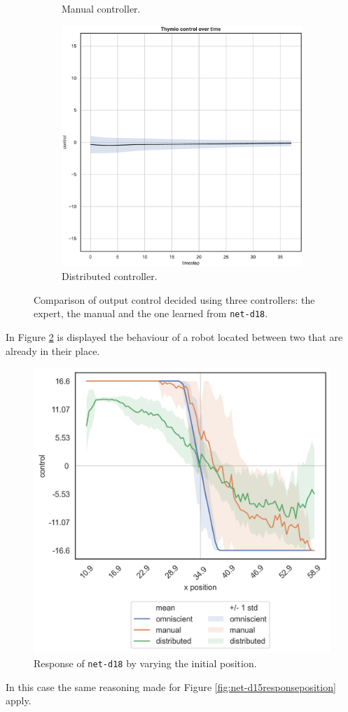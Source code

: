 \begin{figure}[!htb]
\begin{subfigure}[h]{0.3\textwidth}
		\caption{Manual controller.}
	\end{subfigure}
	\hfill
	\begin{subfigure}[h]{0.3\textwidth}
		\centering
		\includegraphics[width=\textwidth]{contents/images/net-d18/control-overtime-learned_distributed}
		\caption{Distributed controller.}
	\end{subfigure}
	\caption[Evaluation of the control decided by \texttt{net-d18}.]{Comparison 
		of output control decided using three controllers: the expert, the manual and 
		the one learned from \texttt{net-d18}.}
	\label{fig:net-d18control}
\end{figure}

In Figure \ref{fig:net-d18responseposition} is displayed the behaviour of a robot 
located between two that are already in their place.
\begin{figure}[!htb]
	\centering
	\includegraphics[width=.45\textwidth]{contents/images/net-d18/response-varying_init_position-distributed}%
	\caption{Response of \texttt{net-d18} by varying the initial position.}
	\label{fig:net-d18responseposition}
\end{figure}
In this case the same reasoning made for Figure 
\ref{fig:net-d15responseposition} apply.

